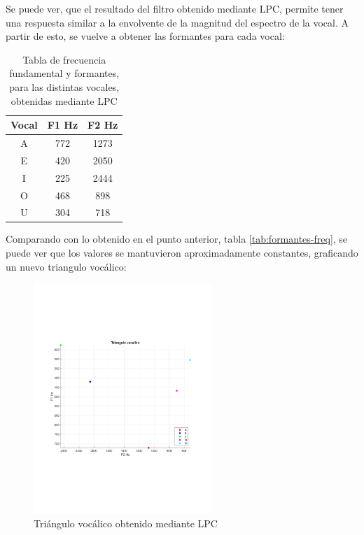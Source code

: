 	Se puede ver, que el resultado del filtro obtenido mediante LPC, permite tener una respuesta similar a la envolvente de la magnitud del espectro de la vocal. A partir de esto, se vuelve a obtener las formantes para cada vocal:
	\begin{table}[H]
		\center
		\begin{tabular}{|c|c|c|}
			\hline
			\textbf{Vocal}  & \textbf{F1 Hz} & \textbf{F2 Hz} \\
			\hline 
			A & 772 & 1273 \\
			\hline
			E & 420 & 2050 \\
			\hline
			I & 225 & 2444 \\
			\hline
			O & 468 & 898 \\
			\hline
			U & 304 & 718\\
			\hline
		\end{tabular}
		\caption{Tabla de frecuencia fundamental y formantes, para las distintas vocales, obtenidas mediante LPC}
		\label{tab:formantes-freq_lpc}
	\end{table}
	
	Comparando con lo obtenido en el punto anterior, tabla \ref{tab:formantes-freq}, se puede ver que los valores se mantuvieron aproximadamente constantes, graficando un nuevo triangulo vocálico:
	\begin{figure}[H]
		\center
		\includegraphics[width=0.6\textwidth,clip, trim = {1.9cm 6.8cm 2.3cm 7cm}]{../plots/vocalic_triang_2.pdf}
		\caption{Triángulo vocálico obtenido mediante LPC}
		\label{fig:vocal_triang_LPC}
	\end{figure}
	
